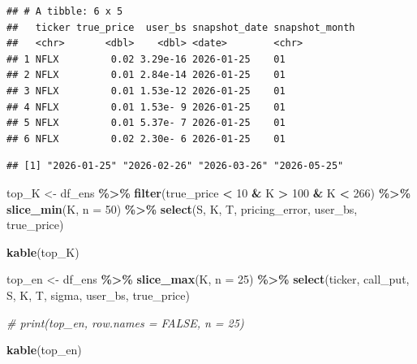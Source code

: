 \documentclass[
]{article}
\newenvironment{Shaded}{\begin{snugshade}}{\end{snugshade}}
\newcommand{\AttributeTok}[1]{\textcolor[rgb]{0.13,0.29,0.53}{#1}}
\newcommand{\CommentTok}[1]{\textcolor[rgb]{0.56,0.35,0.01}{\textit{#1}}}
\newcommand{\DecValTok}[1]{\textcolor[rgb]{0.00,0.00,0.81}{#1}}
\newcommand{\FunctionTok}[1]{\textcolor[rgb]{0.13,0.29,0.53}{\textbf{#1}}}
\newcommand{\NormalTok}[1]{#1}
\newcommand{\OtherTok}[1]{\textcolor[rgb]{0.56,0.35,0.01}{#1}}
\newcommand{\SpecialCharTok}[1]{\textcolor[rgb]{0.81,0.36,0.00}{\textbf{#1}}}
\begin{document}
\begin{verbatim}
## # A tibble: 6 x 5
##   ticker true_price  user_bs snapshot_date snapshot_month
##   <chr>       <dbl>    <dbl> <date>        <chr>         
## 1 NFLX         0.02 3.29e-16 2026-01-25    01            
## 2 NFLX         0.01 2.84e-14 2026-01-25    01            
## 3 NFLX         0.01 1.53e-12 2026-01-25    01            
## 4 NFLX         0.01 1.53e- 9 2026-01-25    01            
## 5 NFLX         0.01 5.37e- 7 2026-01-25    01            
## 6 NFLX         0.02 2.30e- 6 2026-01-25    01
\end{verbatim}

\begin{verbatim}
## [1] "2026-01-25" "2026-02-26" "2026-03-26" "2026-05-25"
\end{verbatim}

\begin{Shaded}
\begin{Highlighting}[]
\NormalTok{top\_K }\OtherTok{\textless{}{-}}\NormalTok{ df\_ens }\SpecialCharTok{\%\textgreater{}\%}
  \FunctionTok{filter}\NormalTok{(true\_price }\SpecialCharTok{\textless{}} \DecValTok{10} \SpecialCharTok{\&}\NormalTok{ K }\SpecialCharTok{\textgreater{}} \DecValTok{100} \SpecialCharTok{\&}\NormalTok{ K }\SpecialCharTok{\textless{}} \DecValTok{266}\NormalTok{) }\SpecialCharTok{\%\textgreater{}\%}
  \FunctionTok{slice\_min}\NormalTok{(K, }\AttributeTok{n =} \DecValTok{50}\NormalTok{) }\SpecialCharTok{\%\textgreater{}\%}
  \FunctionTok{select}\NormalTok{(S, K, T, pricing\_error, user\_bs, true\_price)}

\FunctionTok{kable}\NormalTok{(top\_K)}
\end{Highlighting}
\end{Shaded}

\begin{Shaded}
\begin{Highlighting}[]
\NormalTok{top\_en }\OtherTok{\textless{}{-}}\NormalTok{ df\_ens }\SpecialCharTok{\%\textgreater{}\%}
  \FunctionTok{slice\_max}\NormalTok{(K, }\AttributeTok{n =} \DecValTok{25}\NormalTok{) }\SpecialCharTok{\%\textgreater{}\%}
  \FunctionTok{select}\NormalTok{(ticker, call\_put, S, K, T, sigma, user\_bs, true\_price)}

\CommentTok{\# print(top\_en, row.names = FALSE, n = 25)}

\FunctionTok{kable}\NormalTok{(top\_en)}
\end{Highlighting}
\end{Shaded}
\end{document}
